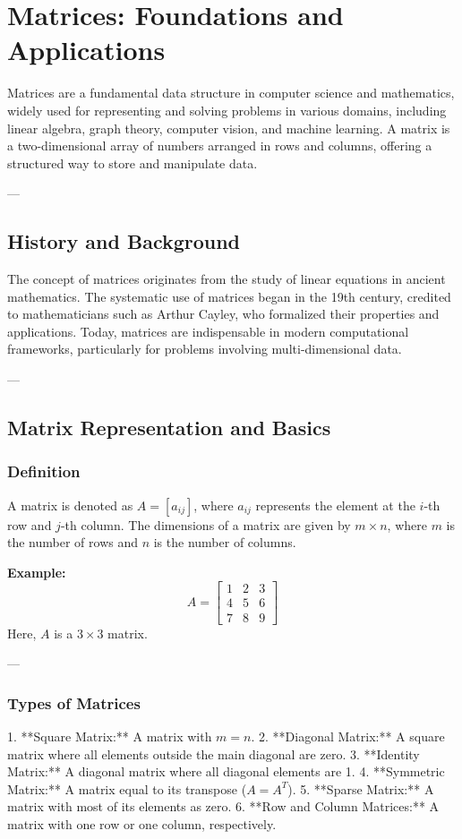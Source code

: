 
\chapter{Matrices: Foundations and Applications}
\label{chap:Matrices}

Matrices are a fundamental data structure in computer science and mathematics, widely used for representing and solving problems in various domains, including linear algebra, graph theory, computer vision, and machine learning. A matrix is a two-dimensional array of numbers arranged in rows and columns, offering a structured way to store and manipulate data.

---

\section*{History and Background}
The concept of matrices originates from the study of linear equations in ancient mathematics. The systematic use of matrices began in the 19th century, credited to mathematicians such as Arthur Cayley, who formalized their properties and applications. Today, matrices are indispensable in modern computational frameworks, particularly for problems involving multi-dimensional data.

---

\section*{Matrix Representation and Basics}

\subsection*{Definition}
A matrix is denoted as \(A = [a_{ij}]\), where \(a_{ij}\) represents the element at the \(i\)-th row and \(j\)-th column. The dimensions of a matrix are given by \(m \times n\), where \(m\) is the number of rows and \(n\) is the number of columns.

\textbf{Example:}
\[
A =
\begin{bmatrix}
1 & 2 & 3 \\
4 & 5 & 6 \\
7 & 8 & 9
\end{bmatrix}
\]
Here, \(A\) is a \(3 \times 3\) matrix.

---

\subsection*{Types of Matrices}
1. **Square Matrix:** A matrix with \(m = n\).
2. **Diagonal Matrix:** A square matrix where all elements outside the main diagonal are zero.
3. **Identity Matrix:** A diagonal matrix where all diagonal elements are 1.
4. **Symmetric Matrix:** A matrix equal to its transpose (\(A = A^T\)).
5. **Sparse Matrix:** A matrix with most of its elements as zero.
6. **Row and Column Matrices:** A matrix with one row or one column, respectively.

